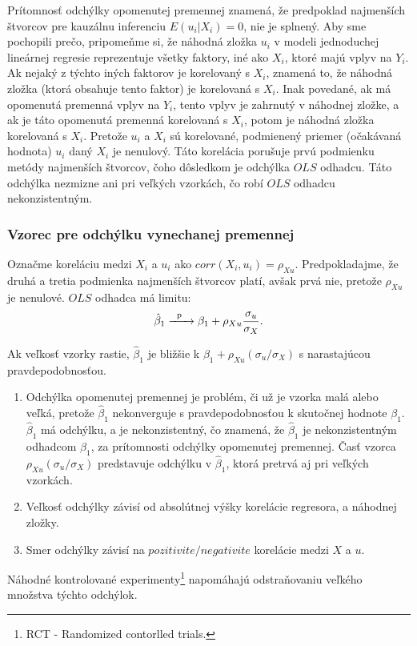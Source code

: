 \documentclass[]{tukediphc}
\begin{document}
Prítomnosť odchýlky opomenutej premennej znamená, že predpoklad najmenších štvorcov pre kauzálnu inferenciu $E(u_{i} | X_{i}) = 0$, nie je splnený. Aby sme pochopili prečo, pripomeňme si, že náhodná zložka $u_i$ v modeli jednoduchej lineárnej regresie reprezentuje všetky faktory, iné ako $X_{i}$, ktoré majú vplyv na $Y_{i}$. Ak nejaký z týchto iných faktorov je korelovaný s $X_{i}$, znamená to, že náhodná zložka (ktorá obsahuje tento faktor) je korelovaná s $X_{i}$. Inak povedané, ak má opomenutá premenná vplyv na $Y_{i}$, tento vplyv je zahrnutý v náhodnej zložke, a ak je táto opomenutá premenná korelovaná s $X_{i}$, potom je náhodná zložka korelovaná s $X_{i}$. Pretože $u_{i}$ a $X_{i}$ sú korelované, podmienený priemer (očakávaná hodnota) $u_{i}$ daný $X_{i}$ je nenulový. Táto korelácia porušuje prvú podmienku metódy najmenších štvorcov, čoho dôsledkom je odchýlka $OLS$ odhadcu. Táto odchýlka nezmizne ani pri veľkých vzorkách, čo robí $OLS$ odhadcu nekonzistentným. 

\subsubsection{Vzorec pre odchýlku vynechanej premennej}

Označme koreláciu medzi $X_{i}$ a $u_{i}$ ako $corr(X_{i}, u_{i}) = \rho_{Xu}$. Predpokladajme, že druhá a tretia podmienka najmenších štvorcov platí, avšak prvá nie, pretože $\rho_{Xu}$ je nenulové. $OLS$ odhadca má limitu:
\begin{equation}
    \hat\beta_{1}\xrightarrow[\text{}]{\text{\; p \; }}\beta_{1}+\rho_{Xu}\frac{\sigma_{u}}{\sigma_{X}}.
\end{equation}

Ak veľkosť vzorky rastie, $\hat\beta_{1}$ je bližšie k $\beta_{1} + \rho_{Xu}(\sigma_{u} / \sigma_{X})$ s narastajúcou pravdepodobnosťou. 
\begin{enumerate}
\item  Odchýlka opomenutej premennej je problém, či už je vzorka malá alebo veľká, pretože $\hat\beta_{1}$  nekonverguje s pravdepodobnosťou k skutočnej hodnote $\beta_{1}$. $\hat\beta_{1}$ má odchýlku, a je nekonzistentný, čo znamená, že $\hat\beta_{1}$ je nekonzistentným odhadcom $\beta_{1}$, za prítomnosti odchýlky opomenutej premennej. Časť vzorca $\rho_{Xu}(\sigma_{u} / \sigma_{X})$ predstavuje odchýlku v $\hat\beta_{1}$, ktorá pretrvá aj pri veľkých vzorkách.  
\item Veľkosť odchýlky závisí od absolútnej výšky korelácie regresora, a náhodnej zložky. 
\item Smer odchýlky závisí na $pozitivite / negativite$ korelácie medzi $X$ a $u$.
\end{enumerate}
Náhodné kontrolované experimenty\footnote{RCT - Randomized contorlled trials.} napomáhajú odstraňovaniu veľkého množstva týchto odchýlok.
\end{document}
